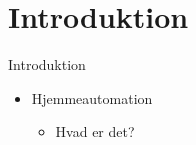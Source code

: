 \section{Introduktion}
\begin{frame}{Introduktion}{}
\begin{itemize}
	\item Hjemmeautomation
	\begin{itemize}
		\item Hvad er det?
	\end{itemize}
\end{itemize}
\end{frame}